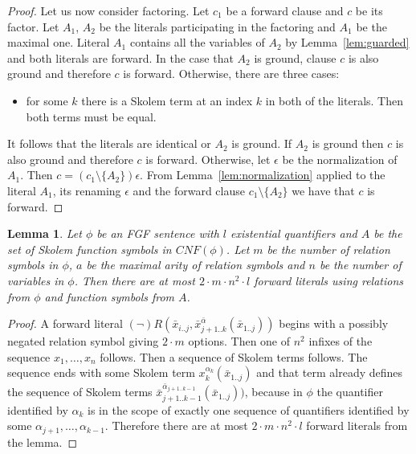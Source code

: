 \documentclass[english, shortabstract]{iithesis}
\theoremstyle{definition} \newtheorem{definition}{Definition}[chapter]
\theoremstyle{remark} \newtheorem{remark}[definition]{Observation}
\theoremstyle{plain} \newtheorem{theorem}[definition]{Theorem}
\theoremstyle{plain} \newtheorem{lemma}[definition]{Lemma}
\begin{document}
\begin{proof}
\par Let us now consider factoring. Let $c_1$ be a forward clause and $c$ be its factor.
Let $A_1$, $A_2$ be the literals participating in the factoring and $A_1$ be the maximal one.
Literal $A_1$ contains all the variables of $A_2$ by Lemma~\ref{lem:guarded} and both literals are forward. 
In the case that $A_2$ is ground, clause $c$ is also ground and therefore $c$ is forward. 
Otherwise, there are three cases:
\begin{itemize}
    \item for some $k$ there is a Skolem term at an index $k$ in both of the literals. Then both terms must be equal.
\end{itemize}
It follows that the literals are identical or $A_2$ is ground. If $A_2$ is ground then $c$ is also ground and therefore $c$ is forward.
Otherwise, let $\epsilon$ be the normalization of $A_1$.
Then $c=(c_1\setminus\{A_2\})\epsilon$. From Lemma~\ref{lem:normalization} applied to the 
literal $A_1$, its renaming $\epsilon$ and the forward clause $c_1\setminus\{A_2\}$ we have that $c$ is forward.
\end{proof}

\begin{lemma}\label{lem:size}
Let $\phi$ be an FGF sentence with $l$ existential quantifiers and 
$A$ be the set of Skolem function symbols in $\mathit{CNF}(\phi)$.
Let $m$ be the number of relation symbols in $\phi$, $a$ be the maximal arity
of relation symbols and $n$ be the number of variables in $\phi$. 
Then there are at most $2\cdot m \cdot n^2 \cdot l$ forward literals using relations from $\phi$ and function symbols from $A$.
\end{lemma}
\begin{proof}
A forward literal $(\lnot)R(\bar{x}_{i..j}, \bar{x}^{\bar{\alpha}}_{{j+1..k}}(\bar{x}_{1..j}))$
begins with a possibly negated relation symbol giving $2\cdot m$ options. 
Then one of $n^2$ infixes of the sequence $x_1, \dots, x_n$ follows.
Then a sequence of Skolem terms follows.
The sequence ends with some Skolem term $x^{\alpha_k}_k(\bar{x}_{1..j})$ and that term 
already defines the sequence of Skolem terms $\bar{x}^{\bar{\alpha}_{j+1..k-1}}_{{j+1..k-1}}(\bar{x}_{1..j}))$,
because in $\phi$ the quantifier identified by $\alpha_k$ is in the scope of exactly one sequence of quantifiers identified by some $\alpha_{j+1},\dots, \alpha_{k-1}$.
Therefore there are at most $2\cdot m \cdot n^2 \cdot l$ forward literals from the lemma.
\end{proof}
\end{document}
